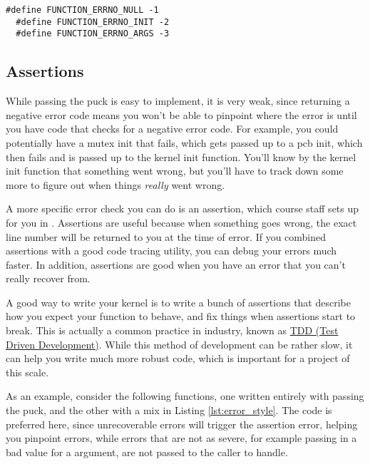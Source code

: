 \documentclass{article}
\begin{document}
\begin{lstlisting}[caption={Negative error code defines}]
  #define FUNCTION_ERRNO_NULL -1
  #define FUNCTION_ERRNO_INIT -2
  #define FUNCTION_ERRNO_ARGS -3
\end{lstlisting}

\subsection{Assertions}
While passing the puck is easy to implement, it is very weak, since returning a negative error code means you won't
be able to pinpoint where the error is until you have code that checks for a negative error code.
For example, you could potentially have a mutex init that fails, which gets passed up to a pcb init,
which then fails and is passed up to the kernel init function. You'll know by the kernel init 
function that something went wrong, but you'll have to track down some more to figure out when things
\textit{really} went wrong.

A more specific error check you can do is an assertion, which course staff sets 
up for you in . Assertions are useful because when something goes wrong,
the exact line number will be returned to you at the time of error. If you combined
assertions with a good code tracing utility, you can debug your errors much faster.
In addition, assertions are good when you have an error that you can't really recover from.

A good way to write your kernel is to write a bunch of assertions that 
describe how you expect your function to behave, and fix things when
assertions start to break. This is actually a common practice in industry, 
known as 
\href{https://en.wikipedia.org/wiki/Test-driven_development}{TDD (Test Driven Development)}.
While this method of development can be rather slow, it can help you write much more
robust code, which is important for a project of this scale.

As an example, consider the following functions, one written entirely with passing the puck,
and the other with a mix in Listing \ref{lst:error_style}.
The  code is preferred here, since unrecoverable errors will
trigger the assertion error, helping you pinpoint errors, while errors that are
not as severe, for example passing in a bad value for a argument, are not passed
to the caller to handle. 
\end{document}
